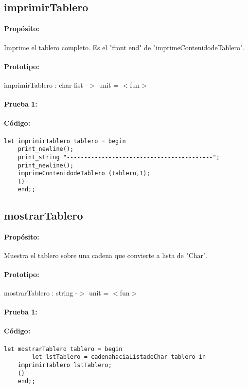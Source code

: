 \subsection{imprimirTablero}

\paragraph{Propósito:} Imprime el tablero completo. Es el "front end" de
"imprimeContenidodeTablero".
\paragraph{Prototipo:} imprimirTablero : char list -$>$ unit = $<$fun$>$
\paragraph{Prueba 1:}
\paragraph{Código:}
\begin{verbatim}
let imprimirTablero tablero = begin
	print_newline();
	print_string "------------------------------------------";
	print_newline();
	imprimeContenidodeTablero (tablero,1);
	()
	end;;
\end{verbatim}

\subsection{mostrarTablero}

\paragraph{Propósito:} Muestra el tablero sobre una cadena que convierte a lista de "Char". 
\paragraph{Prototipo:} mostrarTablero : string -$>$ unit = $<$fun$>$
\paragraph{Prueba 1:}
\paragraph{Código:}
\begin{verbatim}
let mostrarTablero tablero = begin
        let lstTablero = cadenahaciaListadeChar tablero in 
	imprimirTablero lstTablero;
	()
	end;;
\end{verbatim}

